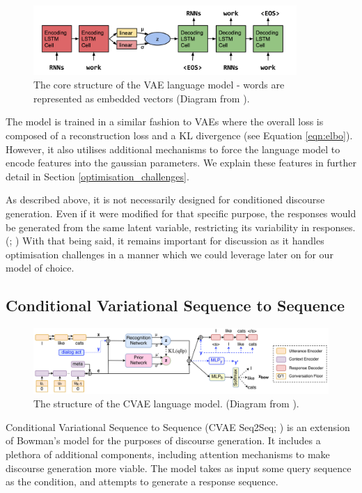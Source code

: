 \documentclass[12pt,twoside]{report}
\begin{document}
\begin{figure}[!ht]
	\centering
	\includegraphics[width=100mm]{diagrams/seq2seqvae.png}
	\caption{The core structure of the VAE language model - words are represented as embedded vectors (Diagram from \cite{bowman_generating_2015}). \label{vae_seq2seq}}
\end{figure}

The model is trained in a similar fashion to VAEs where the overall loss is composed of a reconstruction loss and a KL divergence (see Equation \ref{eqn:elbo}). However, it also utilises additional mechanisms to force the language model to encode features into the gaussian parameters. We explain these features in further detail in Section \ref{optimisation_challenges}.

As described above, it is not necessarily designed for conditioned discourse generation. Even if it were modified for that specific purpose, the responses would be generated from the same latent variable, restricting its variability in responses. (\cite{zhao_learning_2017}; \cite{du_variational_2018}) With that being said, it remains important for discussion as it handles optimisation challenges in a manner which we could leverage later on for our model of choice.

\subsection{Conditional Variational Sequence to Sequence}

\begin{figure}[!ht]
	\centering
	\includegraphics[width=120mm]{diagrams/cvae_seq2seq.png}
	\caption{The structure of the CVAE language model. (Diagram from \cite{zhao_learning_2017}). \label{cvae_seq2seq}}
\end{figure}

Conditional Variational Sequence to Sequence (CVAE Seq2Seq; \cite{zhao_learning_2017}) is an extension of Bowman's model for the purposes of discourse generation. It includes a plethora of additional components, including attention mechanisms to make discourse generation more viable. The model takes as input some query sequence as the condition, and attempts to generate a response sequence.
\end{document}
